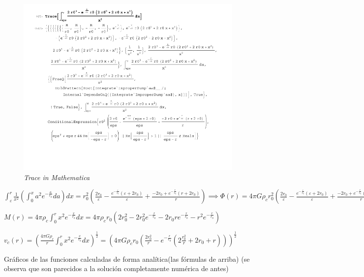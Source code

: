 \documentclass[12pt]{book}
\begin{document}
\begin{description}
\begin{figure}[!ht]
 \centering
 \includegraphics[scale=0.5]{traceInt.png}
 \caption{\emph{Trace in Mathematica}}
\end{figure}


\item  $\int_\varepsilon^r{\frac{1}{x^2} ( \int_0^x{a^2 e^{-\frac{a}{r_0}}da} ) dx} =  r_0^2 (\frac{2 r_0}{\varepsilon} - \frac{e^{-\frac{\varepsilon}{r_0}}(\varepsilon + 2 r_0)  }{\varepsilon}
+ \frac{-2 r_0 + e^{-\frac{r}{r_0}} (r + 2 r_0) }{r} ) 
\implies \Phi(r) = 4 \pi G \rho_c r_0^2 (\frac{2 r_0}{\varepsilon} - \frac{e^{-\frac{\varepsilon}{r_0}}(\varepsilon + 2 r_0)  }{\varepsilon}
+ \frac{-2 r_0 + e^{-\frac{r}{r_0}} (r + 2 r_0) }{r} )$

\item $M(r) = 4 \pi \rho_c \int_0^r{x^2 e^{-\frac{x}{r_0}}dx} = 4 \pi \rho_c r_0 ( 2 r_0^2 - 2 r_0^2 e^{-\frac{r}{r_0}} - 2 r_0 r e^{-\frac{r}{r_0}} - r^2 e^{-\frac{r}{r_0}}) $

\item $v_c(r) = (\frac{4 \pi G \rho_c}{r}\int_0^r{x^2 e^{-\frac{x}{r_0}}dx} )^{\frac{1}{2}}   
= (4 \pi G \rho_c r_0 (\frac{2 r_0^2}{r} -  e^{-\frac{r}{r_0}} (2 \frac{r_0^2}{r} +  2 r_0 + r) ))^{\frac{1}{2}} $


\item Gráficos de las funciones calculadas de forma analítica(las fórmulas de arriba) (se observa que son parecidos a la solución completamente numérica de antes)



\end{description}
\end{document}
